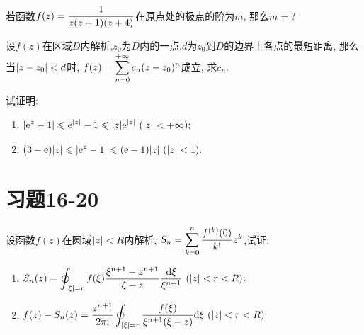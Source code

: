 \begin{yyEx}
	若函数$\begin{lgathered}
		f(z) = \frac{1}{z(z+1)(z+4)}
	\end{lgathered}$在原点处的极点的阶为$m$, 那么$m = ?$
\end{yyEx}

\begin{yyEx}
	设$f(z)$在区域$D$内解析,$z_0$为$D$内的一点,$d$为$z_0$到$D$的边界上各点的最短距离, 那么当$\lvert z-z_0\rvert<d$时, $\begin{lgathered}
		f(z) = \sum_{n = 0}^{+\infty}c_n(z-z_0)^n
	\end{lgathered}$成立, 求$c_n$.
\end{yyEx}

\begin{yyEx}
	试证明:
	\begin{enumerate}
		\item $\begin{lgathered}
			\abs{\mathrm{e}^z-1}\leqslant \mathrm{e}^{\abs{z}}-1\leqslant \abs{z}\mathrm{e}^{\abs{z}}~(\abs{z}<+\infty);
		\end{lgathered}$
		\item $\begin{lgathered}
		(3-\mathrm{e})\abs{z}\leqslant \abs{\mathrm{e}^z-1}\leqslant (\mathrm{e}-1)\abs{z}~(\abs{z}<1).
		\end{lgathered}$
	\end{enumerate}
\end{yyEx}

\section{习题16-20}

\begin{yyEx}
	设函数$f(z)$在圆域$\lvert z\rvert<R$内解析, $\begin{lgathered}
		S_n = \sum_{k=0}^n\frac{f^{(k)}(0)}{k!}z^k
	\end{lgathered}$,试证:
	\begin{enumerate}
		\item $\begin{lgathered}
			S_n(z) = \oint_{\abs{\xi} = r}f(\xi)\frac{\xi^{n+1}-z^{n+1}}{\xi-z}\frac{\mathrm{d}\xi}{\xi^{n+1}}~(\abs{z}<r<R);
		\end{lgathered}$
		\item $\begin{lgathered}
		f(z) - S_n(z) =\frac{z^{n+1}}{2\pi\mathrm{i}} \oint_{\abs{\xi} = r}\frac{f(\xi)}{\xi^{n+1}(\xi-z)}\mathrm{d}\xi~(\abs{z}<r<R).
		\end{lgathered}$
	\end{enumerate}
\end{yyEx}

